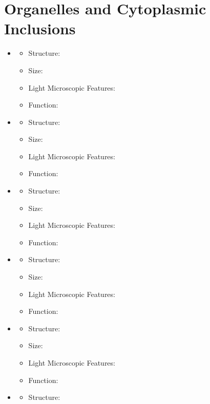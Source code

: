 \section{Organelles and Cytoplasmic Inclusions}
\begin{itemize}
  \item {}
  \begin{itemize}
    \item Structure:
    \item Size:
    \item Light Microscopic Features:
    \item Function:
  \end{itemize}
  \item {}
  \begin{itemize}
    \item Structure:
    \item Size:
    \item Light Microscopic Features:
    \item Function:
  \end{itemize}
  \item {}
  \begin{itemize}
    \item Structure:
    \item Size:
    \item Light Microscopic Features:
    \item Function:
  \end{itemize}
  \item {}
  \begin{itemize}
    \item Structure:
    \item Size:
    \item Light Microscopic Features:
    \item Function:
  \end{itemize}
  \item {}
  \begin{itemize}
    \item Structure:
    \item Size:
    \item Light Microscopic Features:
    \item Function:
  \end{itemize}
  \item {}
  \begin{itemize}
    \item Structure:

\end{itemize}
\end{itemize}
